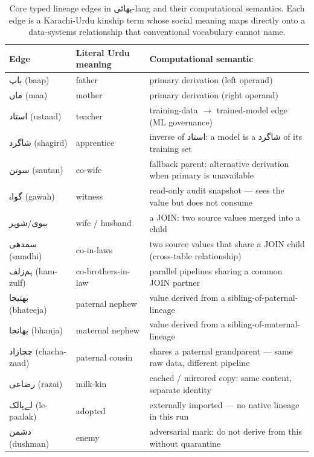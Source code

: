 \documentclass[10pt,twocolumn]{article}
\newcommand{\ur}[1]{{\urdufont #1}}
\begin{document}
\begin{table}[t]
\centering
\small
\begin{tabular}{lll}
\hline
Edge & Literal Urdu meaning & Computational semantic \\
\hline
\ur{باپ} (baap) & father & primary derivation (left operand) \\
\ur{ماں} (maa) & mother & primary derivation (right operand) \\
\ur{استاد} (ustaad) & teacher & training-data $\to$ trained-model edge (ML governance) \\
\ur{شاگرد} (shagird) & apprentice & inverse of \ur{استاد}: a model is a \ur{شاگرد} of its training set \\
\ur{سوتن} (sautan) & co-wife & fallback parent: alternative derivation when primary is unavailable \\
\ur{گواہ} (gawah) & witness & read-only audit snapshot — sees the value but does not consume \\
\ur{بیوی}/\ur{شوہر} & wife / husband & a JOIN: two source values merged into a child \\
\ur{سمدھی} (samdhi) & co-in-laws & two source values that share a JOIN child (cross-table relationship) \\
\ur{ہم‌زلف} (ham-zulf) & co-brothers-in-law & parallel pipelines sharing a common JOIN partner \\
\ur{بھتیجا} (bhateeja) & paternal nephew & value derived from a sibling-of-paternal-lineage \\
\ur{بھانجا} (bhanja) & maternal nephew & value derived from a sibling-of-maternal-lineage \\
\ur{چچازاد} (chacha-zaad) & paternal cousin & shares a paternal grandparent — same raw data, different pipeline \\
\ur{رضاعی} (razai) & milk-kin & cached / mirrored copy: same content, separate identity \\
\ur{لے‌پالک} (le-paalak) & adopted & externally imported — no native lineage in this run \\
\ur{دشمن} (dushman) & enemy & adversarial mark: do not derive from this without quarantine \\
\hline
\end{tabular}
\caption{Core typed lineage edges in \ur{بھائی}-lang and their computational semantics. Each edge is a Karachi-Urdu kinship term whose social meaning maps directly onto a data-systems relationship that conventional vocabulary cannot name.}
\label{tab:edges}
\end{table}
\end{document}
